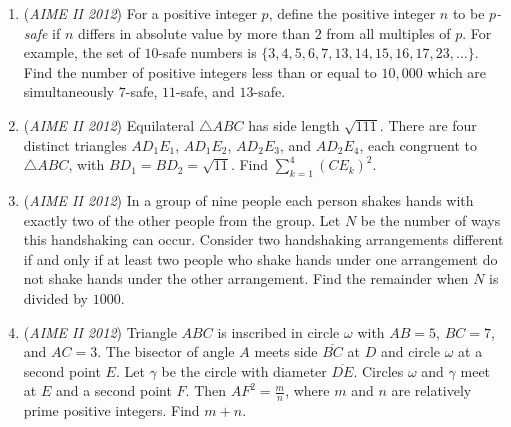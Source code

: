 \begin{enumerate}
 

	\item (\textit{AIME II 2012}) For a positive integer $p$, define the positive integer $n$ to be $p$\textit{-safe} if $n$ differs in absolute value by more than $2$ from all multiples of $p$. For example, the set of $10$-safe numbers is $\{ 3, 4, 5, 6, 7, 13, 14, 15, 16, 17, 23, \ldots\}$. Find the number of positive integers less than or equal to $10,000$ which are simultaneously $7$-safe, $11$-safe, and $13$-safe.


 

	\item (\textit{AIME II 2012}) Equilateral $\triangle ABC$ has side length $\sqrt{111}$. There are four distinct triangles $AD_1E_1$, $AD_1E_2$, $AD_2E_3$, and $AD_2E_4$, each congruent to $\triangle ABC$,
with $BD_1 = BD_2 = \sqrt{11}$. Find $\sum_{k=1}^4(CE_k)^2$.


 

	\item (\textit{AIME II 2012}) In a group of nine people each person shakes hands with exactly two of the other people from the group. Let $N$ be the number of ways this handshaking can occur. Consider two handshaking arrangements different if and only if at least two people who shake hands under one arrangement do not shake hands under the other arrangement. Find the remainder when $N$ is divided by $1000$.


 

	\item (\textit{AIME II 2012}) Triangle $ABC$ is inscribed in circle $\omega$ with $AB=5$, $BC=7$, and $AC=3$. The bisector of angle $A$ meets side $\overline{BC}$ at $D$ and circle $\omega$ at a second point $E$. Let $\gamma$ be the circle with diameter $\overline{DE}$. Circles $\omega$ and $\gamma$ meet at $E$ and a second point $F$. Then $AF^2 = \frac mn$, where $m$ and $n$ are relatively prime positive integers. Find $m+n$.


 

\end{enumerate}